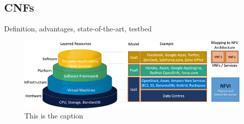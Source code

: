 \subsection{CNFs}
Definition, advantages, state-of-the-art, testbed 



\begin{figure}
	\centering
	\includegraphics[width=1\linewidth]{images/arch.png}
	\caption{This is the caption \cite{mijumbi2016network}}
	\label{img:arch}
\end{figure}

